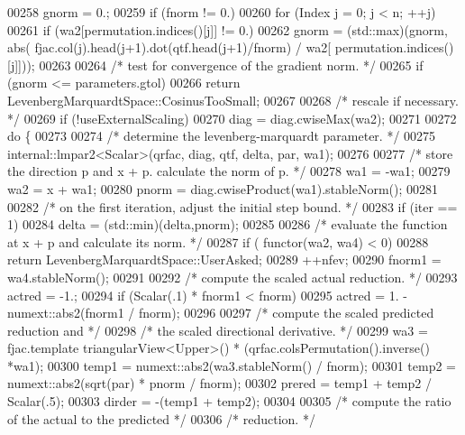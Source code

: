 \begin{DoxyCode}
00258     gnorm = 0.;
00259     \textcolor{keywordflow}{if} (fnorm != 0.)
00260         \textcolor{keywordflow}{for} (Index j = 0; j < n; ++j)
00261             \textcolor{keywordflow}{if} (wa2[permutation.indices()[j]] != 0.)
00262                 gnorm = (std::max)(gnorm, abs( fjac.col(j).head(j+1).dot(qtf.head(j+1)/fnorm) / wa2[
      permutation.indices()[j]]));
00263 
00264     \textcolor{comment}{/* test for convergence of the gradient norm. */}
00265     \textcolor{keywordflow}{if} (gnorm <= parameters.gtol)
00266         \textcolor{keywordflow}{return} LevenbergMarquardtSpace::CosinusTooSmall;
00267 
00268     \textcolor{comment}{/* rescale if necessary. */}
00269     \textcolor{keywordflow}{if} (!useExternalScaling)
00270         diag = diag.cwiseMax(wa2);
00271 
00272     \textcolor{keywordflow}{do} \{
00273 
00274         \textcolor{comment}{/* determine the levenberg-marquardt parameter. */}
00275         internal::lmpar2<Scalar>(qrfac, diag, qtf, delta, par, wa1);
00276 
00277         \textcolor{comment}{/* store the direction p and x + p. calculate the norm of p. */}
00278         wa1 = -wa1;
00279         wa2 = x + wa1;
00280         pnorm = diag.cwiseProduct(wa1).stableNorm();
00281 
00282         \textcolor{comment}{/* on the first iteration, adjust the initial step bound. */}
00283         \textcolor{keywordflow}{if} (iter == 1)
00284             delta = (std::min)(delta,pnorm);
00285 
00286         \textcolor{comment}{/* evaluate the function at x + p and calculate its norm. */}
00287         \textcolor{keywordflow}{if} ( functor(wa2, wa4) < 0)
00288             \textcolor{keywordflow}{return} LevenbergMarquardtSpace::UserAsked;
00289         ++nfev;
00290         fnorm1 = wa4.stableNorm();
00291 
00292         \textcolor{comment}{/* compute the scaled actual reduction. */}
00293         actred = -1.;
00294         \textcolor{keywordflow}{if} (Scalar(.1) * fnorm1 < fnorm)
00295             actred = 1. - numext::abs2(fnorm1 / fnorm);
00296 
00297         \textcolor{comment}{/* compute the scaled predicted reduction and */}
00298         \textcolor{comment}{/* the scaled directional derivative. */}
00299         wa3 = fjac.template triangularView<Upper>() * (qrfac.colsPermutation().inverse() *wa1);
00300         temp1 = numext::abs2(wa3.stableNorm() / fnorm);
00301         temp2 = numext::abs2(sqrt(par) * pnorm / fnorm);
00302         prered = temp1 + temp2 / Scalar(.5);
00303         dirder = -(temp1 + temp2);
00304 
00305         \textcolor{comment}{/* compute the ratio of the actual to the predicted */}
00306         \textcolor{comment}{/* reduction. */}

\end{DoxyCode}

